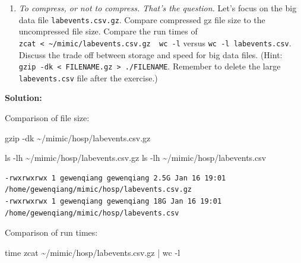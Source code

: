 \documentclass[
]{article}
\newenvironment{Shaded}{\begin{snugshade}}{\end{snugshade}}
\newcommand{\AttributeTok}[1]{\textcolor[rgb]{0.40,0.45,0.13}{#1}}
\newcommand{\BuiltInTok}[1]{\textcolor[rgb]{0.00,0.23,0.31}{#1}}
\newcommand{\FunctionTok}[1]{\textcolor[rgb]{0.28,0.35,0.67}{#1}}
\newcommand{\KeywordTok}[1]{\textcolor[rgb]{0.00,0.23,0.31}{#1}}
\newcommand{\NormalTok}[1]{\textcolor[rgb]{0.00,0.23,0.31}{#1}}
\providecommand{\tightlist}{%
  \setlength{\itemsep}{0pt}\setlength{\parskip}{0pt}}\usepackage{longtable,booktabs,array}
\begin{document}
\begin{enumerate}
\def\labelenumi{\arabic{enumi}.}
\setcounter{enumi}{7}
\tightlist
\item
  \emph{To compress, or not to compress. That's the question.} Let's
  focus on the big data file \texttt{labevents.csv.gz}. Compare
  compressed gz file size to the uncompressed file size. Compare the run
  times of
  \texttt{zcat\ \textless{}\ \textasciitilde{}/mimic/labevents.csv.gz\ \textbar{}\ wc\ -l}
  versus \texttt{wc\ -l\ labevents.csv}. Discuss the trade off between
  storage and speed for big data files. (Hint:
  \texttt{gzip\ -dk\ \textless{}\ FILENAME.gz\ \textgreater{}\ ./FILENAME}.
  Remember to delete the large \texttt{labevents.csv} file after the
  exercise.)
\end{enumerate}

\textbf{Solution:}

Comparison of file size:

\begin{Shaded}
\begin{Highlighting}[]
\FunctionTok{gzip} \AttributeTok{{-}dk}\NormalTok{ \textasciitilde{}/mimic/hosp/labevents.csv.gz}
\end{Highlighting}
\end{Shaded}

\begin{Shaded}
\begin{Highlighting}[]
\FunctionTok{ls} \AttributeTok{{-}lh}\NormalTok{ \textasciitilde{}/mimic/hosp/labevents.csv.gz}
\FunctionTok{ls} \AttributeTok{{-}lh}\NormalTok{ \textasciitilde{}/mimic/hosp/labevents.csv}
\end{Highlighting}
\end{Shaded}

\begin{verbatim}
-rwxrwxrwx 1 gewenqiang gewenqiang 2.5G Jan 16 19:01 /home/gewenqiang/mimic/hosp/labevents.csv.gz
-rwxrwxrwx 1 gewenqiang gewenqiang 18G Jan 16 19:01 /home/gewenqiang/mimic/hosp/labevents.csv
\end{verbatim}

Comparison of run times:

\begin{Shaded}
\begin{Highlighting}[]
\BuiltInTok{time}\NormalTok{ zcat \textasciitilde{}/mimic/hosp/labevents.csv.gz }\KeywordTok{|} \FunctionTok{wc} \AttributeTok{{-}l}
\end{Highlighting}
\end{Shaded}
\end{document}
